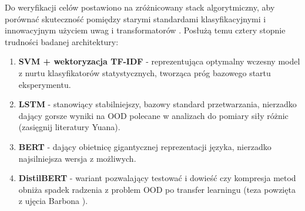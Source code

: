 \documentclass[runningheads]{llncs}
\begin{document}
Do weryfikacji celów postawiono na zróżnicowany stack algorytmiczny, aby porównać skuteczność pomiędzy starymi standardami klasyfikacyjnymi i innowacyjnym użyciem uwag i transformatorów \cite{DBLP:journals/corr/abs-1109-6341, s22218184}. Posłużą temu cztery stopnie trudności badanej architektury:
\begin{enumerate}
    \item \textbf{SVM + wektoryzacja TF-IDF} - reprezentująca optymalny wczesny model z nurtu klasyfikatorów statystycznych, tworząca próg bazowego startu eksperymentu.
    \item \textbf{LSTM} - stanowiący stabilniejszy, bazowy standard przetwarzania, nierzadko dający gorsze wyniki na OOD polecane w analizach do pomiary siły różnic (zasięgnij literatury Yuana\cite{Yuan2026EmpiricalSO}).
    \item \textbf{BERT} - dający obietnicę gigantycznej reprezentacji języka, nierzadko najsilniejsza wersja z możliwych.
    \item \textbf{DistilBERT} - wariant pozwalający testować i dowieść czy kompresja metod obniża spadek radzenia z problem OOD po transfer learningu (teza powzięta z ujęcia Barbona \cite{s22218184}).
\end{enumerate}



\end{document}
